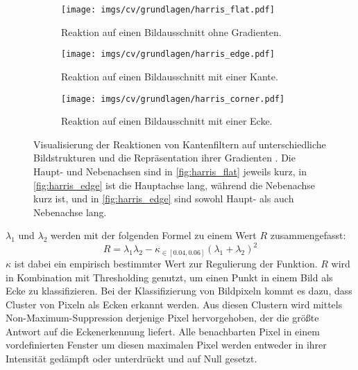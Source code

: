 
\begin{figure}
    \centering
    \begin{subfigure}{0.3\textwidth}
        \centering
        \texttt{[image: imgs/cv/grundlagen/harris\_flat.pdf]}
        \caption{Reaktion auf einen Bildausschnitt ohne Gradienten.}
        \label{fig:harris_flat}
    \end{subfigure}
    \hfill
    \begin{subfigure}{0.3\textwidth}
        \centering
        \texttt{[image: imgs/cv/grundlagen/harris\_edge.pdf]}
        \caption{Reaktion auf einen Bildausschnitt mit einer Kante.}
        \label{fig:harris_edge}
    \end{subfigure}
    \hfill
    \begin{subfigure}{0.3\textwidth}
        \centering
        \texttt{[image: imgs/cv/grundlagen/harris\_corner.pdf]}
        \caption{Reaktion auf einen Bildausschnitt mit einer Ecke.}
        \label{fig:harris_corner}
    \end{subfigure}
    \caption{Visualisierung der Reaktionen von Kantenfiltern auf unterschiedliche Bildstrukturen und die Repräsentation ihrer Gradienten \cite{harris_visualization}. Die Haupt- und Nebenachsen sind in \autoref{fig:harris_flat} jeweils kurz, in \autoref{fig:harris_edge} ist die Hauptachse lang, während die Nebenachse kurz ist, und in \autoref{fig:harris_edge} sind sowohl Haupt- als auch Nebenachse lang.}
    \label{fig:harris}
\end{figure}

$\lambda_1$ und $\lambda_2$ werden mit der folgenden Formel zu einem Wert $R$ zusammengefasst:
\[ R = \lambda_1 \lambda_2 - \kappa_{\in[0.04, 0.06]}(\lambda_1 + \lambda_2)^2 \]
$\kappa$ ist dabei ein empirisch bestimmter Wert zur Regulierung der Funktion. $R$ wird in Kombination mit Thresholding genutzt, um einen Punkt in einem Bild als Ecke zu klassifizieren.
Bei der Klassifizierung von Bildpixeln kommt es dazu, dass Cluster von Pixeln als Ecken erkannt werden. Aus diesen Clustern wird mittels Non-Maximum-Suppression derjenige Pixel hervorgehoben, der die größte Antwort auf die Eckenerkennung liefert. Alle benachbarten Pixel in einem vordefinierten Fenster um diesen maximalen Pixel werden entweder in ihrer Intensität gedämpft oder unterdrückt und auf Null gesetzt.



